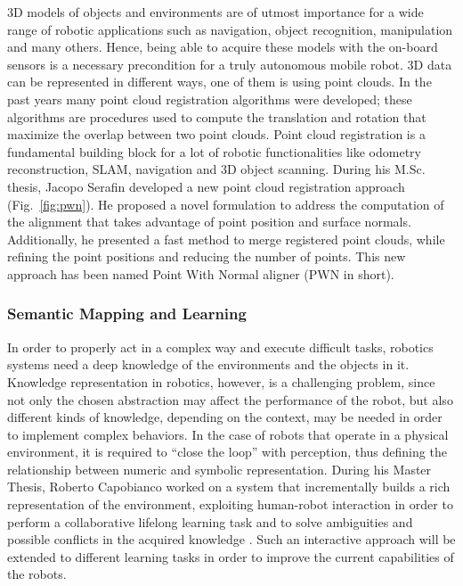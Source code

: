 \documentclass[conference]{IEEEtran}
\begin{document}
3D models of objects and environments are of utmost importance for a wide range of robotic applications such as navigation, object recognition, manipulation and many others. Hence, being able to acquire these models with the on-board sensors is a necessary precondition for a truly autonomous mobile robot. 3D data can be represented in different ways, one of them is using point clouds. In the past years many point cloud registration algorithms were developed; these algorithms are procedures used to compute the translation and rotation that maximize the overlap between two point clouds. Point cloud registration is a fundamental building block for a lot of robotic functionalities like odometry reconstruction, SLAM, navigation and 3D object scanning. During his M.Sc. thesis, Jacopo Serafin developed a new point cloud registration approach (Fig.~\ref{fig:pwn}). He proposed a novel formulation to address the computation of the alignment that takes advantage of point position and surface normals. Additionally, he presented a fast method to merge registered point clouds, while refining the point positions and reducing the number of points. This new approach has been named Point With Normal aligner (PWN in short).   

\subsubsection{Semantic Mapping and Learning}\label{sec:semantic_map}
In order to properly act in a complex way and execute difficult tasks, robotics systems need a deep knowledge of the environments and the objects in it. Knowledge representation in robotics, however, is a challenging problem, since not only the chosen abstraction may affect the performance of the robot, but also different kinds of knowledge, depending on the context, may be needed in order to implement complex behaviors. In the case of robots that operate in a physical environment, it is required to “close the loop” with perception, thus defining the relationship between numeric and symbolic representation. During his Master Thesis, Roberto Capobianco worked on a system that incrementally builds a rich representation of the environment, exploiting human-robot interaction in order to perform a collaborative lifelong learning task and to solve ambiguities and possible conflicts in the acquired knowledge \cite{bastianelli2013line}\cite{bastianelliBCGIN13}. Such an interactive approach will be extended to different learning tasks in order to improve the current capabilities of the robots.
\end{document}
